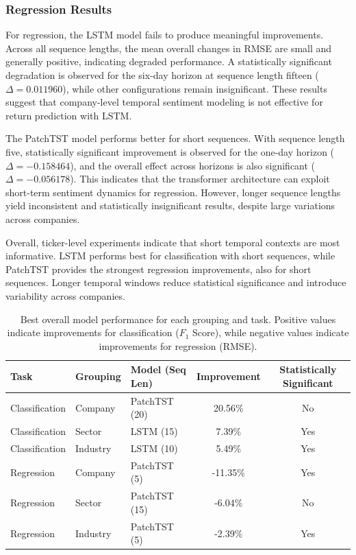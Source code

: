 \subsubsection{Regression Results}

For regression, the LSTM model fails to produce meaningful improvements. Across all sequence lengths, the mean overall changes in RMSE are small and generally positive, indicating degraded performance. A statistically significant degradation is observed for the six-day horizon at sequence length fifteen ($\Delta = 0.011960$), while other configurations remain insignificant. These results suggest that company-level temporal sentiment modeling is not effective for return prediction with LSTM.

The PatchTST model performs better for short sequences. With sequence length five, statistically significant improvement is observed for the one-day horizon ($\Delta = -0.158464$), and the overall effect across horizons is also significant ($\Delta = -0.056178$). This indicates that the transformer architecture can exploit short-term sentiment dynamics for regression. However, longer sequence lengths yield inconsistent and statistically insignificant results, despite large variations across companies.

Overall, ticker-level experiments indicate that short temporal contexts are most informative. LSTM performs best for classification with short sequences, while PatchTST provides the strongest regression improvements, also for short sequences. Longer temporal windows reduce statistical significance and introduce variability across companies.

\begin{table}[t]
\centering
\caption{Best overall model performance for each grouping and task. Positive values indicate improvements for classification ($F_1$ Score), while negative values indicate improvements for regression (RMSE).}
\label{tab:lstm_patchtst_overall}
\begin{tabular}{|l|l|l|c|c|}
\hline
Task & Grouping & Model (Seq Len) & Improvement & Statistically Significant \\
\hline
Classification & Company  & PatchTST (20) & 20.56\% & No \\
Classification & Sector   & LSTM (15)     & 7.39\%  & Yes \\
Classification & Industry & LSTM (10)     & 5.49\%  & Yes \\
\hline
Regression & Company  & PatchTST (5)  & -11.35\% & Yes \\
Regression & Sector   & PatchTST (15) & -6.04\%  & No \\
Regression & Industry & PatchTST (5)  & -2.39\%  & Yes \\
\hline
\end{tabular}
\end{table}

